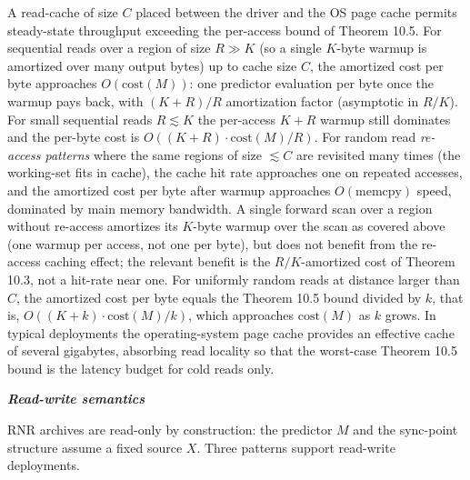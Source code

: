 \documentclass[
]{article}
\begin{document}
A read-cache of size $C$ placed between the driver and the OS page
cache permits steady-state throughput exceeding the per-access bound
of Theorem 10.5. For sequential reads over a region of size $R \gg
K$ (so a single $K$-byte warmup is amortized over many output
bytes) up to cache size $C$, the amortized cost per byte approaches
$O(\mathrm{cost}(M))$: one predictor evaluation per byte once the
warmup pays back, with $(K + R)/R$ amortization factor (asymptotic
in $R/K$). For small sequential reads $R \lesssim K$ the
per-access $K + R$ warmup still dominates and the per-byte cost is
$O((K + R) \cdot \mathrm{cost}(M) / R)$. For random read \emph{re-access patterns} where the same regions
of size $\lesssim C$ are revisited many times (the working-set fits
in cache), the cache hit rate approaches one on repeated accesses,
and the amortized cost per byte after warmup approaches
$O(\mathrm{memcpy})$ speed, dominated by main memory bandwidth.
A single forward scan over a region without re-access amortizes
its $K$-byte warmup over the scan as covered above (one warmup
per access, not one per byte), but does not benefit from the
re-access caching effect; the relevant benefit is the
$R/K$-amortized cost of Theorem 10.3, not a hit-rate near one. For
uniformly random reads at distance larger than $C$, the amortized
cost per byte equals the Theorem 10.5 bound divided by $k$, that is,
$O((K + k) \cdot \mathrm{cost}(M) / k)$, which approaches
$\mathrm{cost}(M)$ as $k$ grows. In typical deployments the
operating-system page cache provides an effective cache of several
gigabytes, absorbing read locality so that the worst-case Theorem
10.5 bound is the latency budget for cold reads only.

\emph{\textbf{Read-write semantics}}

RNR archives are read-only by construction: the predictor $M$ and the
sync-point structure assume a fixed source $X$. Three patterns
support read-write deployments.
\end{document}

